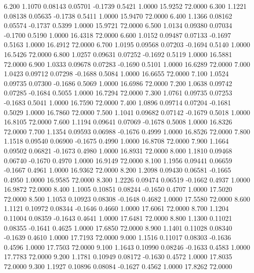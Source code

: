    6.200   1.1070   0.08143   0.05701  -0.1739   0.5421   1.0000  15.9252  72.0000
   6.300   1.1221   0.08138   0.05635  -0.1738   0.5411   1.0000  15.9470  72.0000
   6.400   1.1366   0.08162   0.05574  -0.1737   0.5399   1.0000  15.9721  72.0000
   6.500   1.0134   0.09380   0.07034  -0.1700   0.5190   1.0000  16.4318  72.0000
   6.600   1.0152   0.09487   0.07133  -0.1697   0.5163   1.0000  16.4912  72.0000
   6.700   1.0195   0.09568   0.07203  -0.1694   0.5140   1.0000  16.5426  72.0000
   6.800   1.0257   0.09631   0.07252  -0.1692   0.5119   1.0000  16.5881  72.0000
   6.900   1.0333   0.09678   0.07283  -0.1690   0.5101   1.0000  16.6289  72.0000
   7.000   1.0423   0.09712   0.07298  -0.1688   0.5084   1.0000  16.6655  72.0000
   7.100   1.0524   0.09735   0.07300  -0.1686   0.5069   1.0000  16.6986  72.0000
   7.200   1.0638   0.09742   0.07285  -0.1684   0.5055   1.0000  16.7294  72.0000
   7.300   1.0761   0.09735   0.07253  -0.1683   0.5041   1.0000  16.7590  72.0000
   7.400   1.0896   0.09714   0.07204  -0.1681   0.5029   1.0000  16.7860  72.0000
   7.500   1.1041   0.09682   0.07142  -0.1679   0.5018   1.0000  16.8105  72.0000
   7.600   1.1194   0.09641   0.07069  -0.1678   0.5008   1.0000  16.8326  72.0000
   7.700   1.1354   0.09593   0.06988  -0.1676   0.4999   1.0000  16.8526  72.0000
   7.800   1.1518   0.09540   0.06900  -0.1675   0.4990   1.0000  16.8708  72.0000
   7.900   1.1664   0.09502   0.06821  -0.1673   0.4980   1.0000  16.8931  72.0000
   8.000   1.1810   0.09468   0.06740  -0.1670   0.4970   1.0000  16.9149  72.0000
   8.100   1.1956   0.09441   0.06659  -0.1667   0.4961   1.0000  16.9362  72.0000
   8.200   1.2098   0.09430   0.06581  -0.1665   0.4950   1.0000  16.9585  72.0000
   8.300   1.2226   0.09474   0.06519  -0.1662   0.4937   1.0000  16.9872  72.0000
   8.400   1.1005   0.10851   0.08244  -0.1650   0.4707   1.0000  17.5020  72.0000
   8.500   1.1053   0.10923   0.08308  -0.1648   0.4682   1.0000  17.5580  72.0000
   8.600   1.1121   0.10972   0.08344  -0.1646   0.4660   1.0000  17.6061  72.0000
   8.700   1.1204   0.11004   0.08359  -0.1643   0.4641   1.0000  17.6481  72.0000
   8.800   1.1300   0.11021   0.08355  -0.1641   0.4625   1.0000  17.6850  72.0000
   8.900   1.1401   0.11028   0.08340  -0.1639   0.4610   1.0000  17.7193  72.0000
   9.000   1.1516   0.11017   0.08303  -0.1636   0.4596   1.0000  17.7503  72.0000
   9.100   1.1643   0.10990   0.08246  -0.1633   0.4583   1.0000  17.7783  72.0000
   9.200   1.1781   0.10949   0.08172  -0.1630   0.4572   1.0000  17.8035  72.0000
   9.300   1.1927   0.10896   0.08084  -0.1627   0.4562   1.0000  17.8262  72.0000
